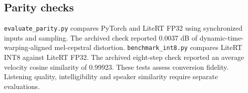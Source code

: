 \subsection{Parity checks}

\texttt{evaluate\_parity.py} compares PyTorch and LiteRT FP32 using
synchronized inputs and sampling. The archived check reported 0.0037 dB of
dynamic-time-warping-aligned mel-cepstral distortion.
\texttt{benchmark\_int8.py} compares LiteRT INT8 against LiteRT FP32.
The archived eight-step check reported an average velocity cosine similarity
of 0.99923. These tests assess conversion fidelity. Listening quality,
intelligibility and speaker similarity require separate evaluations.
